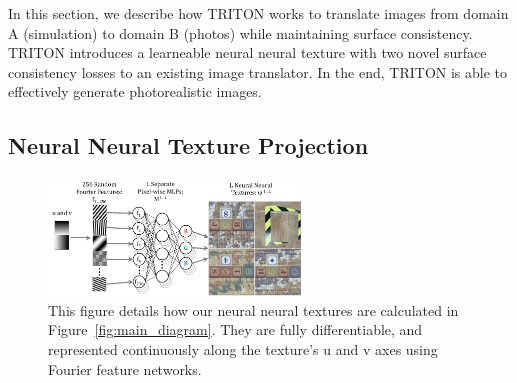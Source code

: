 \documentclass{article}
\begin{document}
		In this section, we describe how TRITON works to translate images from domain A (simulation) to domain B (photos) while maintaining surface consistency. 
		TRITON introduces a learneable neural neural texture with two novel surface consistency losses to an existing image translator. In the end, TRITON is able to effectively generate photorealistic images.
\vspace{-3pt}
	\subsection{Neural Neural Texture Projection}
	\vspace{-3pt}
		\begin{figure}[thbp]
		    \vspace{-5pt}
			\begin{center}
				\includegraphics[width=0.6\textwidth]{../images/learnable_textures.pdf}
			\end{center}
			\vspace{-3pt}
			\caption{
				This figure details how our neural neural textures are calculated in Figure~\ref{fig:main_diagram}. They are fully differentiable, and represented continuously along the texture's u and v axes using Fourier feature networks.
			}
			\vspace{-10pt}
			\label{fig:learnable_textures}
		\end{figure}

\end{document}

